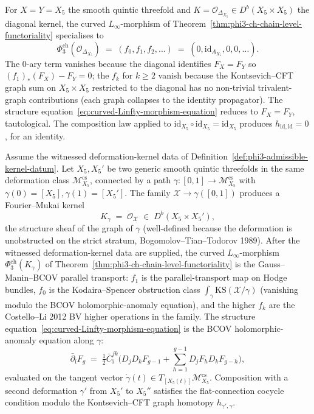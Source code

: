 \begin{remark}
\label{rem:phi3-ch-functoriality-id}
For $X = Y = X_5$ the smooth quintic threefold and $K = \mathcal{O}_{\Delta_{X_5}} \in D^b(X_5 \times X_5)$ the diagonal kernel, the curved $L_\infty$-morphism of Theorem~\ref{thm:phi3-ch-chain-level-functoriality} specialises to
\[
 \Phi_3^{\mathrm{ch}}(\mathcal{O}_{\Delta_{X_5}}) \;=\; (f_0, f_1, f_2, \ldots) \;=\; (0, \mathrm{id}_{A_{X_5}}, 0, 0, \ldots).
\]
The $0$-ary term vanishes because the diagonal identifies $F_X = F_Y$ so $(f_1)_*(F_X) - F_Y = 0$; the $f_k$ for $k \geq 2$ vanish because the Kontsevich--CFT graph sum on $X_5 \times X_5$ restricted to the diagonal has no non-trivial trivalent-graph contributions (each graph collapses to the identity propagator). The structure equation~\eqref{eq:curved-Linfty-morphism-equation} reduces to $F_X = F_Y$, tautological. The composition law applied to $\mathrm{id}_{X_5} \circ \mathrm{id}_{X_5} = \mathrm{id}_{X_5}$ produces $h_{\mathrm{id}, \mathrm{id}} = 0$, for an identity.
\end{remark}

\begin{remark}
\label{rem:phi3-ch-functoriality-deformation}
Assume the witnessed deformation-kernel data of
Definition~\ref{def:phi3-admissible-kernel-datum}.
Let $X_5, X_5'$ be two generic smooth quintic threefolds in the same deformation class $\mathcal{M}_{X_5}^{\mathrm{cs}}$, connected by a path $\gamma \colon [0, 1] \to \mathcal{M}_{X_5}^{\mathrm{cs}}$ with $\gamma(0) = [X_5], \gamma(1) = [X_5']$. The family $\mathcal{X} \to \gamma([0,1])$ produces a Fourier--Mukai kernel
\[
 K_\gamma \;=\; \mathcal{O}_{\mathcal{X}} \;\in\; D^b(X_5 \times X_5'),
\]
the structure sheaf of the graph of $\gamma$ (well-defined because the deformation is unobstructed on the strict stratum, Bogomolov--Tian--Todorov 1989). After the witnessed deformation-kernel data are supplied, the curved $L_\infty$-morphism $\Phi_3^{\mathrm{ch}}(K_\gamma)$ of Theorem~\ref{thm:phi3-ch-chain-level-functoriality} is the Gauss--Manin--BCOV parallel transport: $f_1$ is the parallel-transport map on Hodge bundles, $f_0$ is the Kodaira--Spencer obstruction class $\int_\gamma \mathrm{KS}(\mathcal{X}/\gamma)$ (vanishing modulo the BCOV holomorphic-anomaly equation), and the higher $f_k$ are the Costello--Li 2012 BV higher operations in the family. The structure equation~\eqref{eq:curved-Linfty-morphism-equation} is the BCOV holomorphic-anomaly equation along $\gamma$:
\[
 \bar\partial_{\bar\imath} F_g \;=\; \tfrac{1}{2} \bar C_{\bar\imath}^{jk}\bigl(D_j D_k F_{g-1} + \sum_{h=1}^{g-1} D_j F_h D_k F_{g-h}\bigr),
\]
evaluated on the tangent vector $\dot\gamma(t) \in T_{[X_5(t)]} \mathcal{M}_{X_5}^{\mathrm{cs}}$. Composition with a second deformation $\gamma'$ from $X_5'$ to $X_5''$ satisfies the flat-connection cocycle condition modulo the Kontsevich--CFT graph homotopy $h_{\gamma', \gamma}$.
\end{remark}

